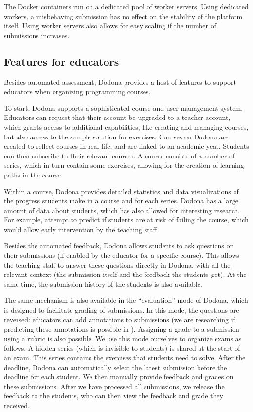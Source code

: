 \documentclass[../main]{subfiles}
\begin{document}
The Docker containers run on a dedicated pool of worker servers.
Using dedicated workers, a misbehaving submission has no effect on the stability of the platform itself.
Using worker servers also allows for easy scaling if the number of submissions increases.

\subsection{Features for educators}\label{subsec:features-for-educators}

Besides automated assessment, Dodona provides a host of features to support educators when organizing programming courses.

To start, Dodona supports a sophisticated course and user management system.
Educators can request that their account be upgraded to a teacher account, which grants access to additional capabilities, like creating and managing courses, but also access to the sample solution for exercises.
Courses on Dodona are created to reflect courses in real life, and are linked to an academic year.
Students can then subscribe to their relevant courses.
A course consists of a number of series, which in turn contain some exercises, allowing for the creation of learning paths in the course.

Within a course, Dodona provides detailed statistics and data visualizations of the progress students make in a course and for each series.
Dodona has a large amount of data about students, which has also allowed for interesting research.
For example, \textcite{vanpetegemPassFailPrediction2023} attempt to predict if students are at risk of failing the course, which would allow early intervention by the teaching staff.

Besides the automated feedback, Dodona allows students to ask questions on their submissions (if enabled by the educator for a specific course).
This allows the teaching staff to answer these questions directly in Dodona, with all the relevant context (the submission itself and the feedback the students got).
At the same time, the submission history of the students is also available.

The same mechanism is also available in the ``evaluation'' mode of Dodona, which is designed to facilitate grading of submissions.
In this mode, the questions are reversed: educators can add annotations to submissions (we are researching if predicting these annotations is possible in \textcite{vanpetegemMiningPatternsSyntax2024}).
Assigning a grade to a submission using a rubric is also possible.
We use this mode ourselves to organize exams as follows.
A hidden series (which is invisible to students) is shared at the start of an exam.
This series contains the exercises that students need to solve.
After the deadline, Dodona can automatically select the latest submission before the deadline for each student.
We then manually provide feedback and grades on these submissions.
After we have processed all submissions, we release the feedback to the students, who can then view the feedback and grade they received.
\end{document}

